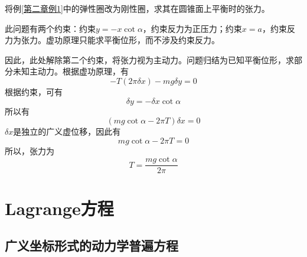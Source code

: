 \begin{example}
将例\ref{第二章例1}中的弹性圈改为刚性圈，求其在圆锥面上平衡时的张力。
\end{example}
\begin{solution}
此问题有两个约束：约束$y=-x\cot\alpha$，约束反力为正压力；约束$x=a$，约束反力为张力。虚功原理只能求平衡位形，而不涉及约束反力。

因此，此处解除第二个约束，将张力视为主动力。问题归结为已知平衡位形，求部分未知主动力。根据虚功原理，有
\begin{equation*}
	-T(2\pi \delta x) - mg\delta y = 0
\end{equation*}
根据约束，可有
\begin{equation*}
	\delta y = -\delta x \cot \alpha
\end{equation*}
所以有
\begin{equation*}
	(mg\cot \alpha - 2\pi T) \delta x = 0
\end{equation*}
$\delta x$是独立的广义虚位移，因此有
\begin{equation*}
	mg\cot \alpha - 2\pi T = 0
\end{equation*}
所以，张力为
\begin{equation*}
	T = \frac{mg\cot \alpha}{2\pi}
\end{equation*}
\end{solution}

\section{Lagrange方程}

\subsection{广义坐标形式的动力学普遍方程}


